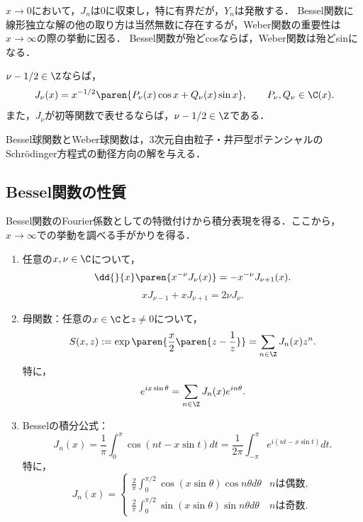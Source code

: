 \documentclass[uplatex,dvipdfmx]{jsreport}
\begin{document}
\begin{remarks}
    $x\to0$において，$J_n$は$0$に収束し，特に有界だが，$Y_n$は発散する．
    Bessel関数に線形独立な解の他の取り方は当然無数に存在するが，Weber関数の重要性は$x\to\infty$の際の挙動に因る．
    Bessel関数が殆どcosならば，Weber関数は殆どsinになる．
\end{remarks}

\begin{proposition}[Bessel球関数の性質]
    $\nu-1/2\in\Z$ならば，
    \[J_\nu(x)=x^{-1/2}\paren{P_\nu(x)\cos x+Q_\nu(x)\sin x},\qquad P_\nu,Q_\nu\in\C(x).\]
    また，$J_\nu$が初等関数で表せるならば，$\nu-1/2\in\Z$である．
\end{proposition}
\begin{remarks}
    Bessel球関数とWeber球関数は，3次元自由粒子・井戸型ポテンシャルのSchrödinger方程式の動径方向の解を与える．
\end{remarks}

\subsection{Bessel関数の性質}

\begin{tcolorbox}[colframe=ForestGreen, colback=ForestGreen!10!white,breakable,colbacktitle=ForestGreen!40!white,coltitle=black,fonttitle=\bfseries\sffamily,
title=]
    Bessel関数のFourier係数としての特徴付けから積分表現を得る．ここから，$x\to\infty$での挙動を調べる手がかりを得る．
\end{tcolorbox}

\begin{proposition}[Bessel関数のFourier係数としての特徴付け]\mbox{}
    \begin{enumerate}
        \item 任意の$x,\nu\in\C$について，
        \[\dd{}{x}\paren{x^{-\nu}J_\nu(x)}=-x^{-\nu}J_{\nu+1}(x).\]
        \[xJ_{\nu-1}+xJ_{\nu+1}=2\nu J_\nu.\]
        \item 母関数：任意の$x\in\C$と$z\ne0$について，
        \[S(x,z):=\exp\paren{\frac{x}{2}\paren{z-\frac{1}{z}}}=\sum_{n\in\Z}J_n(x)z^n.\]
        特に，
        \[e^{ix\sin\theta}=\sum_{n\in\Z}J_n(x)e^{in\theta}.\]
        \item Besselの積分公式：
        \[J_n(x)=\frac{1}{\pi}\int^\pi_0\cos(nt-x\sin t)dt=\frac{1}{2\pi}\int^\pi_{-\pi}e^{i(nt-x\sin t)}dt.\]
        特に，
        \[J_n(x)=\begin{cases}
            \frac{2}{\pi}\int^{\pi/2}_0\cos(x\sin\theta)\cos n\theta d\theta&n\text{は偶数},\\
            \frac{2}{\pi}\int^{\pi/2}_0\sin(x\sin\theta)\sin n\theta d\theta&n\text{は奇数}.
        \end{cases}\]
    \end{enumerate}
\end{proposition}
\end{document}
